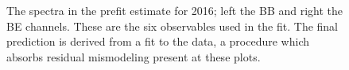 \begin{figure}[!htbp]{
\caption{The \mgg spectra in the prefit estimate for 2016; left the BB and right the BE channels.
These are the six observables used in the fit.
The final prediction is derived from a fit to the data, a procedure which absorbs residual mismodeling present at these plots.}
\label{fig:Prefit_spectra2016}}
\end{figure}

